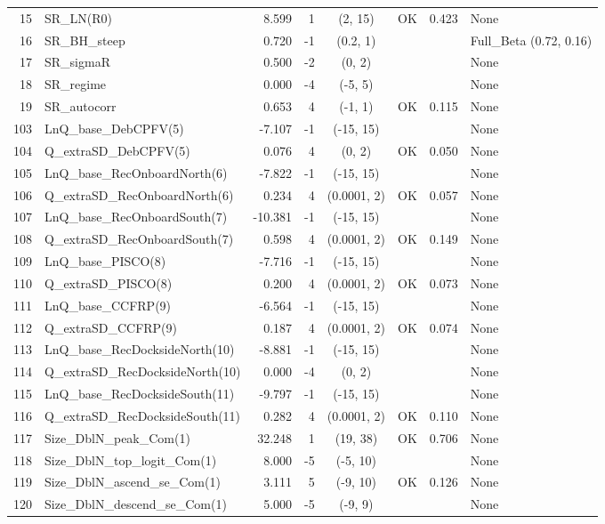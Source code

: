 \documentclass[12pt,]{article}
\begin{document}
\begin{landscape}
\begin{longtable}{rlrrcccp{1.5in}}
  15 & SR\_LN(R0) & 8.599 & 1 & (2, 15) & OK & 0.423 & None \\ 
  16 & SR\_BH\_steep & 0.720 & -1 & (0.2, 1) &  &  & Full\_Beta (0.72, 0.16) \\ 
  17 & SR\_sigmaR & 0.500 & -2 & (0, 2) &  &  & None \\ 
  18 & SR\_regime & 0.000 & -4 & (-5, 5) &  &  & None \\ 
  19 & SR\_autocorr & 0.653 & 4 & (-1, 1) & OK & 0.115 & None \\ 
  103 & LnQ\_base\_DebCPFV(5) & -7.107 & -1 & (-15, 15) &  &  & None \\ 
  104 & Q\_extraSD\_DebCPFV(5) & 0.076 & 4 & (0, 2) & OK & 0.050 & None \\ 
  105 & LnQ\_base\_RecOnboardNorth(6) & -7.822 & -1 & (-15, 15) &  &  & None \\ 
  106 & Q\_extraSD\_RecOnboardNorth(6) & 0.234 & 4 & (0.0001, 2) & OK & 0.057 & None \\ 
  107 & LnQ\_base\_RecOnboardSouth(7) & -10.381 & -1 & (-15, 15) &  &  & None \\ 
  108 & Q\_extraSD\_RecOnboardSouth(7) & 0.598 & 4 & (0.0001, 2) & OK & 0.149 & None \\ 
  109 & LnQ\_base\_PISCO(8) & -7.716 & -1 & (-15, 15) &  &  & None \\ 
  110 & Q\_extraSD\_PISCO(8) & 0.200 & 4 & (0.0001, 2) & OK & 0.073 & None \\ 
  111 & LnQ\_base\_CCFRP(9) & -6.564 & -1 & (-15, 15) &  &  & None \\ 
  112 & Q\_extraSD\_CCFRP(9) & 0.187 & 4 & (0.0001, 2) & OK & 0.074 & None \\ 
  113 & LnQ\_base\_RecDocksideNorth(10) & -8.881 & -1 & (-15, 15) &  &  & None \\ 
  114 & Q\_extraSD\_RecDocksideNorth(10) & 0.000 & -4 & (0, 2) &  &  & None \\ 
  115 & LnQ\_base\_RecDocksideSouth(11) & -9.797 & -1 & (-15, 15) &  &  & None \\ 
  116 & Q\_extraSD\_RecDocksideSouth(11) & 0.282 & 4 & (0.0001, 2) & OK & 0.110 & None \\ 
  117 & Size\_DblN\_peak\_Com(1) & 32.248 & 1 & (19, 38) & OK & 0.706 & None \\ 
  118 & Size\_DblN\_top\_logit\_Com(1) & 8.000 & -5 & (-5, 10) &  &  & None \\ 
  119 & Size\_DblN\_ascend\_se\_Com(1) & 3.111 & 5 & (-9, 10) & OK & 0.126 & None \\ 
  120 & Size\_DblN\_descend\_se\_Com(1) & 5.000 & -5 & (-9, 9) &  &  & None \\ 

\end{longtable}
\end{landscape}
\end{document}
